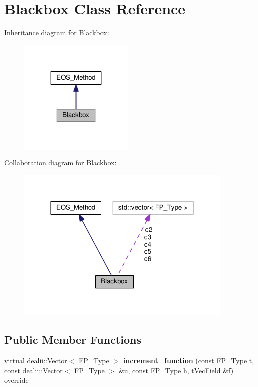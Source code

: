 \hypertarget{classBlackbox}{}\section{Blackbox Class Reference}
\label{classBlackbox}


Inheritance diagram for Blackbox\+:\nopagebreak
\begin{figure}[H]
\begin{center}
\leavevmode
\includegraphics[width=155pt]{classBlackbox__inherit__graph}
\end{center}
\end{figure}


Collaboration diagram for Blackbox\+:\nopagebreak
\begin{figure}[H]
\begin{center}
\leavevmode
\includegraphics[width=294pt]{classBlackbox__coll__graph}
\end{center}
\end{figure}
\subsection*{Public Member Functions}
\begin{DoxyCompactItemize}
\item 
\mbox{\label{classBlackbox_a9b9cb7de1bd53d56d901e6209dd58451}} 
virtual dealii\+::\+Vector$<$ F\+P\+\_\+\+Type $>$ {\bfseries increment\+\_\+function} (const F\+P\+\_\+\+Type t, const dealii\+::\+Vector$<$ F\+P\+\_\+\+Type $>$ \&u, const F\+P\+\_\+\+Type h, t\+Vec\+Field \&f) override
\end{DoxyCompactItemize}
